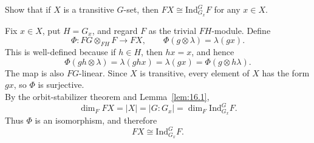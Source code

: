 \documentclass[../Odyssey_Project.tex]{subfiles}
\begin{document}
\begin{exercise}
\label{ex:16.4}
Show that if $X$ is a transitive $G$-set, then $FX \cong \mathrm{Ind}_{G_x}^G F$ for any $x \in X$.
\end{exercise}
\begin{solution}
    Fix $x\in X$, put $H=G_x$, and regard $F$ as the trivial $FH$-module. Define
    \[
        \Phi\colon FG\otimes_{FH}F\to FX,
        \qquad
        \Phi(g\otimes\lambda)=\lambda(gx).
    \]
    This is well-defined because if $h\in H$, then $hx=x$, and hence
    \[
        \Phi(gh\otimes\lambda)
        =
        \lambda(ghx)
        =
        \lambda(gx)
        =
        \Phi(g\otimes h\lambda).
    \]
    The map is also $FG$-linear. Since $X$ is transitive, every element of $X$ has the form $gx$, so $\Phi$ is surjective.\\
    By the orbit-stabilizer theorem and Lemma~\ref{lem:16.1},
    \[
        \dim_FFX
        =
        |X|
        =
        |G : G_x|
        =
        \dim_F\mathrm{Ind}_{G_x}^G F.
    \]
    Thus $\Phi$ is an isomorphism, and therefore
    \[
        FX\cong\mathrm{Ind}_{G_x}^G F.
    \]
\end{solution}
\end{document}
